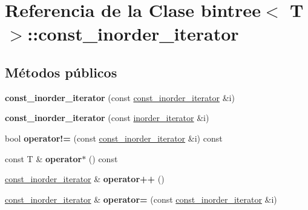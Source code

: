 \hypertarget{classbintree_1_1const__inorder__iterator}{}\section{Referencia de la Clase bintree$<$ T $>$\+:\+:const\+\_\+inorder\+\_\+iterator}
\label{classbintree_1_1const__inorder__iterator}
\subsection*{Métodos públicos}
\begin{DoxyCompactItemize}
\item 
\hypertarget{classbintree_1_1const__inorder__iterator_a349ef30a75ffd281507e23c44b63b47d}{}{\bfseries const\+\_\+inorder\+\_\+iterator} (const \hyperlink{classbintree_1_1const__inorder__iterator}{const\+\_\+inorder\+\_\+iterator} \&i)\label{classbintree_1_1const__inorder__iterator_a349ef30a75ffd281507e23c44b63b47d}

\item 
\hypertarget{classbintree_1_1const__inorder__iterator_a171c3038e7b29757fccdb897398bab7e}{}{\bfseries const\+\_\+inorder\+\_\+iterator} (const \hyperlink{classbintree_1_1inorder__iterator}{inorder\+\_\+iterator} \&i)\label{classbintree_1_1const__inorder__iterator_a171c3038e7b29757fccdb897398bab7e}

\item 
\hypertarget{classbintree_1_1const__inorder__iterator_adb0707c132be502ff6060c0903ee0e15}{}bool {\bfseries operator!=} (const \hyperlink{classbintree_1_1const__inorder__iterator}{const\+\_\+inorder\+\_\+iterator} \&i) const \label{classbintree_1_1const__inorder__iterator_adb0707c132be502ff6060c0903ee0e15}

\item 
\hypertarget{classbintree_1_1const__inorder__iterator_ab3efab537bc01fb254c83efffb5c432e}{}const T \& {\bfseries operator$\ast$} () const \label{classbintree_1_1const__inorder__iterator_ab3efab537bc01fb254c83efffb5c432e}

\item 
\hypertarget{classbintree_1_1const__inorder__iterator_a85da901a2124e3e24921e7cfbfb47e03}{}\hyperlink{classbintree_1_1const__inorder__iterator}{const\+\_\+inorder\+\_\+iterator} \& {\bfseries operator++} ()\label{classbintree_1_1const__inorder__iterator_a85da901a2124e3e24921e7cfbfb47e03}

\item 
\hypertarget{classbintree_1_1const__inorder__iterator_af39b2e86d988ac75caaa302be135a59c}{}\hyperlink{classbintree_1_1const__inorder__iterator}{const\+\_\+inorder\+\_\+iterator} \& {\bfseries operator=} (const \hyperlink{classbintree_1_1const__inorder__iterator}{const\+\_\+inorder\+\_\+iterator} \&i)\label{classbintree_1_1const__inorder__iterator_af39b2e86d988ac75caaa302be135a59c}


\end{DoxyCompactItemize}
